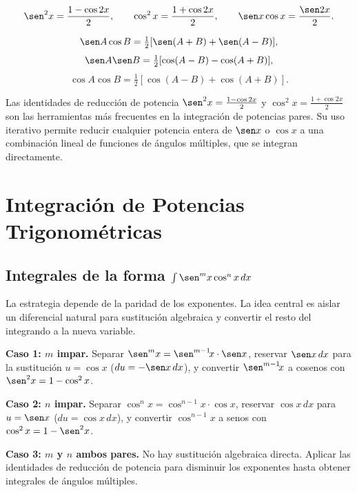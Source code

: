 \begin{theorem}
\[
\sen^2 x = \frac{1 - \cos 2x}{2}, \qquad
\cos^2 x = \frac{1 + \cos 2x}{2}, \qquad
\sen x \cos x = \frac{\sen 2x}{2}.
\]
\end{theorem}

\begin{theorem}
\[
\sen A \cos B = \tfrac{1}{2}[\sen(A+B) + \sen(A-B)],
\]
\[
\sen A \sen B = \tfrac{1}{2}[\cos(A-B) - \cos(A+B)],
\]
\[
\cos A \cos B = \tfrac{1}{2}[\cos(A-B) + \cos(A+B)].
\]
\end{theorem}

\begin{rem}
Las identidades de reducción de potencia $\sen^2 x = \frac{1-\cos 2x}{2}$
y $\cos^2 x = \frac{1+\cos 2x}{2}$ son las herramientas más frecuentes en
la integración de potencias pares. Su uso iterativo permite reducir
cualquier potencia entera de $\sen x$ o $\cos x$ a una combinación lineal
de funciones de ángulos múltiples, que se integran directamente.
\end{rem}

\section{Integración de Potencias Trigonométricas}

\subsection{Integrales de la forma $\int \sen^m x \cos^n x \, dx$}

La estrategia depende de la paridad de los exponentes. La idea central es
aislar un diferencial natural para sustitución algebraica y convertir el
resto del integrando a la nueva variable.

\begin{pasos}
\textbf{Caso 1: $m$ impar.} Separar $\sen^m x = \sen^{m-1}\!x\cdot\sen x$,
reservar $\sen x\,dx$ para la sustitución $u = \cos x$ ($du = -\sen x\,dx$),
y convertir $\sen^{m-1}\!x$ a cosenos con $\sen^2 x = 1-\cos^2 x$.

\textbf{Caso 2: $n$ impar.} Separar $\cos^n x = \cos^{n-1}\!x\cdot\cos x$,
reservar $\cos x\,dx$ para $u = \sen x$ ($du = \cos x\,dx$), y convertir
$\cos^{n-1}\!x$ a senos con $\cos^2 x = 1-\sen^2 x$.

\textbf{Caso 3: $m$ y $n$ ambos pares.} No hay sustitución algebraica
directa. Aplicar las identidades de reducción de potencia para disminuir
los exponentes hasta obtener integrales de ángulos múltiples.
\end{pasos}

